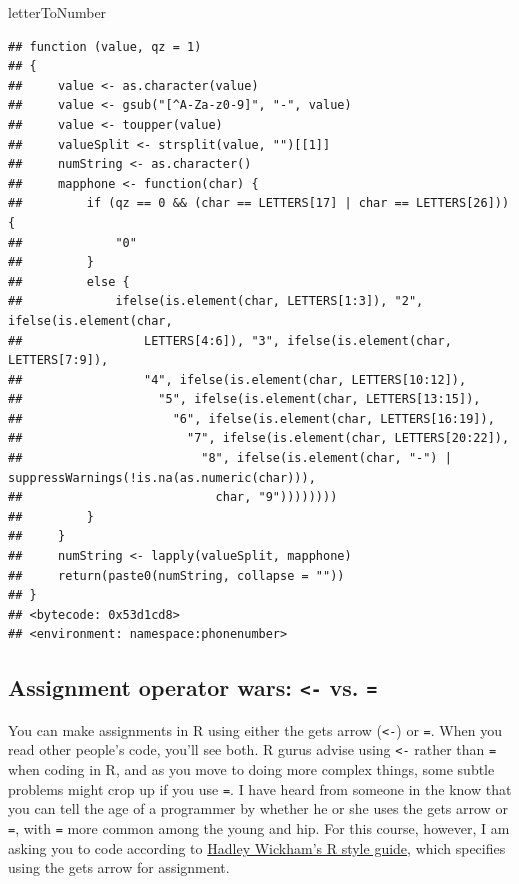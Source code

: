 \documentclass[]{book}
\makeatletter
\newenvironment{Shaded}{\begin{snugshade}}{\end{snugshade}}
\newcommand{\NormalTok}[1]{#1}
\newenvironment{kframe}{%
\medskip{}
\setlength{\fboxsep}{.8em}
 \def\at@end@of@kframe{}%
 \ifinner\ifhmode%
  \def\at@end@of@kframe{\end{minipage}}%
  \begin{minipage}{\columnwidth}%
 \fi\fi%
 \def\FrameCommand##1{\hskip\@totalleftmargin \hskip-\fboxsep
 \colorbox{shadecolor}{##1}\hskip-\fboxsep
     \hskip-\linewidth \hskip-\@totalleftmargin \hskip\columnwidth}%
 \MakeFramed {\advance\hsize-\width
   \@totalleftmargin\z@ \linewidth\hsize
   \@setminipage}}%
 {\par\unskip\endMakeFramed%
 \at@end@of@kframe}
\renewenvironment{Shaded}{\begin{kframe}}{\end{kframe}}
\theoremstyle{definition}
\theoremstyle{definition}
\theoremstyle{definition}
\theoremstyle{remark}
\makeatother
\begin{document}
\begin{Shaded}
\begin{Highlighting}[]
\NormalTok{letterToNumber}
\end{Highlighting}
\end{Shaded}

\begin{verbatim}
## function (value, qz = 1) 
## {
##     value <- as.character(value)
##     value <- gsub("[^A-Za-z0-9]", "-", value)
##     value <- toupper(value)
##     valueSplit <- strsplit(value, "")[[1]]
##     numString <- as.character()
##     mapphone <- function(char) {
##         if (qz == 0 && (char == LETTERS[17] | char == LETTERS[26])) {
##             "0"
##         }
##         else {
##             ifelse(is.element(char, LETTERS[1:3]), "2", ifelse(is.element(char, 
##                 LETTERS[4:6]), "3", ifelse(is.element(char, LETTERS[7:9]), 
##                 "4", ifelse(is.element(char, LETTERS[10:12]), 
##                   "5", ifelse(is.element(char, LETTERS[13:15]), 
##                     "6", ifelse(is.element(char, LETTERS[16:19]), 
##                       "7", ifelse(is.element(char, LETTERS[20:22]), 
##                         "8", ifelse(is.element(char, "-") | suppressWarnings(!is.na(as.numeric(char))), 
##                           char, "9"))))))))
##         }
##     }
##     numString <- lapply(valueSplit, mapphone)
##     return(paste0(numString, collapse = ""))
## }
## <bytecode: 0x53d1cd8>
## <environment: namespace:phonenumber>
\end{verbatim}

\subsection{\texorpdfstring{Assignment operator wars:
\texttt{\textless{}-} vs.
\texttt{=}}{Assignment operator wars: \textless{}- vs. =}}\label{assignment-operator-wars---vs.}

You can make assignments in R using either the gets arrow
(\texttt{\textless{}-}) or \texttt{=}. When you read other people's
code, you'll see both. R gurus advise using \texttt{\textless{}-} rather
than \texttt{=} when coding in R, and as you move to doing more complex
things, some subtle problems might crop up if you use \texttt{=}. I have
heard from someone in the know that you can tell the age of a programmer
by whether he or she uses the gets arrow or \texttt{=}, with \texttt{=}
more common among the young and hip. For this course, however, I am
asking you to code according to
\href{http://adv-r.had.co.nz/Style.html}{Hadley Wickham's R style
guide}, which specifies using the gets arrow for assignment.
\end{document}
